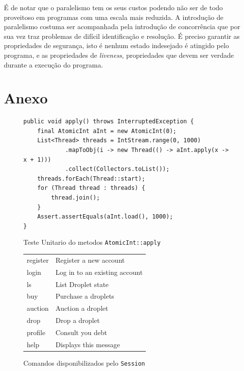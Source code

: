 \documentclass[a4paper]{article}
\begin{document}
É de notar que o paralelismo tem os seus custos podendo não ser de todo proveitoso em programas com uma escala mais reduzida. A introdução de paralelismo costuma ser acompanhada pela introdução de concorrência que por sua vez traz problemas de difícil identificação e resolução. É preciso garantir as propriedades de segurança, isto é nenhum estado indesejado é atingido pelo programa, e as propriedades de \textit{liveness}, propriedades que devem ser verdade durante a execução do programa.


\pagebreak
\section{Anexo}
\begin{figure}[H]
    \begin{verbatim}
public void apply() throws InterruptedException {
    final AtomicInt aInt = new AtomicInt(0);
    List<Thread> threads = IntStream.range(0, 1000)
            .mapToObj(i -> new Thread(() -> aInt.apply(x -> x + 1)))
            .collect(Collectors.toList());
    threads.forEach(Thread::start);
    for (Thread thread : threads) {
        thread.join();
    }
    Assert.assertEquals(aInt.load(), 1000);
}
    \end{verbatim}
    \caption{Teste Unitario do metodos \texttt{AtomicInt::apply}}
\end{figure}
\begin{figure}[H]
    \centering
    \begin{tabular}{ll}
        register   &  Register a new account\\
        login      &  Log in to an existing account\\
        ls         &  List Droplet state\\
        buy        &  Purchase a droplets\\
        auction    &  Auction a droplet\\
        drop       &  Drop a droplet\\
        profile    &  Consult you debt\\
        help       &  Displays this message
    \end{tabular}
    \caption{Comandos disponibilizados pelo \texttt{Session}}
\end{figure}
\end{document}
